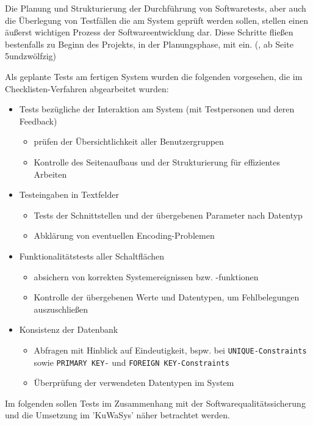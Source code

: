\documentclass[12pt, twoside, a4paper, ngerman]{article}
\begin{document}
Die Planung und Strukturierung der Durchführung von Softwaretests, aber auch die Überlegung von Testfällen die am System geprüft werden sollen, stellen einen äußerst wichtigen Prozess der Softwareentwicklung dar.
Diese Schritte fließen bestenfalls zu Beginn des Projekts, in der Planungsphase, mit ein. (\cite{SPM}, ab Seite 5undzwölfzig)

Als geplante Tests am fertigen System wurden die folgenden vorgesehen, die im Checklisten-Verfahren abgearbeitet wurden:
\begin{itemize}
	\item Tests bezügliche der Interaktion am System (mit Testpersonen und deren Feedback)
	\begin{itemize} 
		 \item prüfen der Übersichtlichkeit aller Benutzergruppen
		 \item Kontrolle des Seitenaufbaus und der Strukturierung für effizientes Arbeiten
	\end{itemize}
	\item Testeingaben in Textfelder
	\begin{itemize} 
		 \item Tests der Schnittstellen und der übergebenen Parameter nach Datentyp
		 \item Abklärung von eventuellen Encoding-Problemen
	\end{itemize}
	\item Funktionalitätstests aller Schaltflächen
	\begin{itemize} 
		 \item absichern von korrekten Systemereignissen bzw. -funktionen
		 \item Kontrolle der übergebenen Werte und Datentypen, um Fehlbelegungen auszuschließen
	\end{itemize}
	\item Konsistenz der Datenbank 
	\begin{itemize} 
		 \item Abfragen mit Hinblick auf Eindeutigkeit, bspw. bei \texttt{UNIQUE-Constraints} sowie \texttt{PRIMARY KEY-} und \texttt{FOREIGN KEY-Constraints}
		 \item Überprüfung der verwendeten Datentypen im System
	\end{itemize}
\end{itemize}

Im folgenden sollen Tests im Zusammenhang mit der Softwarequalitätssicherung und die Umsetzung im 'KuWaSys' näher betrachtet werden.
\end{document}
